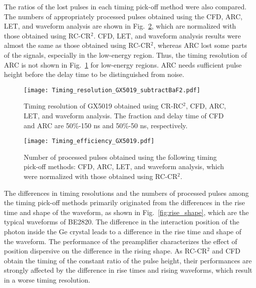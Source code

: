 The ratios of the lost pulses in each timing pick-off method were also compared. 
The numbers of appropriately processed pulses obtained using the CFD, ARC, LET, and waveform analysis are shown in Fig.~\ref{fig:ARC_efficiency}, which are normalized with those obtained using RC-CR$^2$. 
CFD, LET, and waveform analysis results were almost the same as those obtained using RC-CR$^{2}$, whereas ARC lost some parts of the signals, especially in the low-energy region.
Thus, the timing resolution of ARC is not shown in Fig.~\ref{fig:Tresolution} for low-energy regions. 
ARC needs sufficient pulse height before the delay time to be distinguished from noise. 

\begin{figure}
  \centering
  \texttt{[image: Timing\_resolution\_GX5019\_subtractBaF2.pdf]}
  \caption{Timing resolution of GX5019 obtained using CR-RC$^2$, CFD, ARC, LET, and waveform analysis.
  The fraction and delay time of CFD and ARC are 50\%-150 ns and 50\%-50 ns, respectively.}
  \label{fig:Tresolution}
\end{figure}

\begin{figure}
  \centering
  \texttt{[image: Timing\_efficiency\_GX5019.pdf]}
  \caption{Number of processed pulses obtained using the following timing pick-off methods: CFD, ARC, LET, and waveform analysis, which were normalized with those obtained using RC-CR$^2$.}
  \label{fig:ARC_efficiency}
\end{figure}

The differences in timing resolutions and the numbers of processed pulses among the timing pick-off methods primarily originated from 
the differences in the rise time and shape of the waveform, as shown in Fig.~\ref{fig:rise_shape}, which are the typical waveforms of BE2820.
The difference in the interaction position of the photon inside the Ge crystal leads to a difference in the rise time and shape of the waveform. 
The performance of the preamplifier characterizes the effect of position dispersive on the difference in the rising shape. 
As RC-CR$^2$ and CFD obtain the timing of the constant ratio of the pulse height, their performances are strongly affected by the difference in rise times and rising waveforms, which result in a worse timing resolution.

